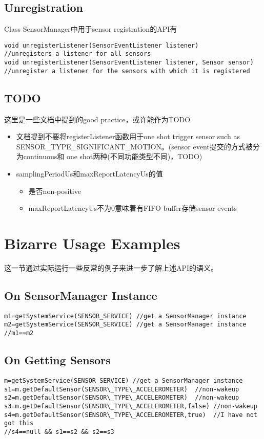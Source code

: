 \documentclass{article}
\begin{document}
{\subsection{Unregistration}
Class SensorManager中用于sensor registration的API有
\begin{lstlisting}
void unregisterListener(SensorEventListener listener)
//unregisters a listener for all sensors
void unregisterListener(SensorEventListener listener, Sensor sensor)
//unregister a listener for the sensors with which it is registered
\end{lstlisting}

\subsection{TODO}
这里是一些文档中提到的good practice，或许能作为TODO
\begin{itemize}
  \item 文档提到不要将registerListener函数用于one shot trigger sensor such as
SENSOR\_TYPE\_SIGNIFICANT\_MOTION。(sensor event提交的方式被分为continuous和
one shot两种(不同功能类型不同)，TODO)
  \item samplingPeriodUs和maxReportLatencyUs的值
    \begin{itemize}
      \item 是否non-positive
      \item maxReportLatencyUs不为0意味着有FIFO buffer存储sensor events
    \end{itemize}
\end{itemize}

\section{Bizarre Usage Examples}
这一节通过实际运行一些反常的例子来进一步了解上述API的语义。
\subsection{On SensorManager Instance}
\begin{lstlisting}
m1=getSystemService(SENSOR_SERVICE) //get a SensorManager instance
m2=getSystemService(SENSOR_SERVICE) //get a SensorManager instance
//m1==m2
\end{lstlisting}

\subsection{On Getting Sensors}
\begin{lstlisting}
m=getSystemService(SENSOR_SERVICE) //get a SensorManager instance
s1=m.getDefaultSensor(SENSOR\_TYPE\_ACCELEROMETER)  //non-wakeup
s2=m.getDefaultSensor(SENSOR\_TYPE\_ACCELEROMETER)  //non-wakeup
s3=m.getDefaultSensor(SENSOR\_TYPE\_ACCELEROMETER,false) //non-wakeup
s4=m.getDefaultSensor(SENSOR\_TYPE\_ACCELEROMETER,true)  //I have not got this
//s4==null && s1==s2 && s2==s3


\end{lstlisting}}
\end{document}
